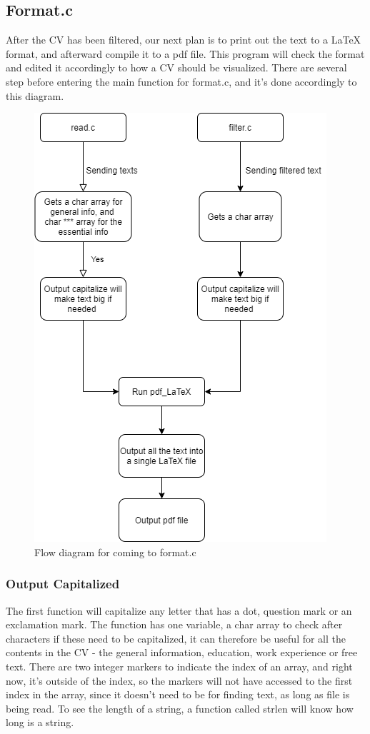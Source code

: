\subsection{Format.c}
After the CV has been filtered, our next plan is to print out the text to a LaTeX format, and afterward compile it to a pdf file. 
This program will check the format and edited it accordingly to how a CV should be visualized. 
There are several step before entering the main function for format.c,
and it's done accordingly to this diagram.
\begin{figure}[H]
  \centering
  \includegraphics[scale = 0.6]{figures/Fra_read.c_og_filter.c_format.c}
  \caption{Flow diagram for coming to format.c}
\end{figure}

\subsubsection{Output Capitalized}
The first function will capitalize any letter that has a dot, question mark or an exclamation mark.
The function has one variable, a char array to check after characters if these need to be capitalized,
it can therefore be useful for all the contents in the CV - the general information, education, work experience or free text.
There are two integer markers to indicate the index of an array, 
and right now, it's outside of the index, so the markers will not have accessed to the first index in the array,
since it doesn't need to be for finding text, as long as file is being read.
To see the length of a string, a function called strlen will know how long is a string. \\

